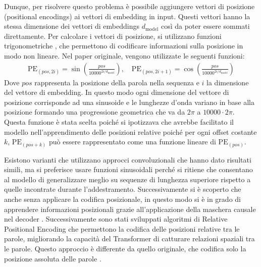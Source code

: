 Dunque, per risolvere questo problema è possibile aggiungere vettori di posizione (positional encodings) ai vettori di embedding in input. Questi vettori hanno la stessa dimensione dei vettori di embeddings  \(d_{\text{model}}\) così da poter essere sommati direttamente. Per calcolare i vettori di posizione, si utilizzano funzioni trigonometriche \cite{dufter2021positioninformationtransformersoverview}, che permettono di codificare informazioni sulla posizione in modo non lineare. Nel paper originale, vengono utilizzate le seguenti funzioni:
\begin{align*}
	\text{PE}_{(pos, 2i)} = \sin\left(\frac{pos}{10000^{2i/d_{\text{model}}}}\right), \quad \text{PE}_{(pos, 2i+1)} = \cos\left(\frac{pos}{10000^{2i/d_{\text{model}}}}\right)
\end{align*}
Dove \(pos\) rappresenta la posizione della parola nella sequenza e \(i\) la dimensione del vettore di embedding. In questo modo ogni dimensione del vettore di posizione corrisponde ad una sinusoide e le lunghezze d'onda variano in base alla posizione formando una progressione geometrica che va da \(2\pi\) a \(10000 \cdot 2\pi\). Questa funzione è stata scelta poiché si ipotizzava che avrebbe facilitato il modello nell'apprendimento delle posizioni relative poiché per ogni offset costante \(k\), \(\text{PE}_{(pos + k)}\) può essere rappresentato come una funzione lineare di \(\text{PE}_{(pos)}\).

Esistono varianti che utilizzano approcci convoluzionali \cite{gehring2017convolutionalsequencesequencelearning} che hanno dato risultati simili, ma si preferisce usare funzioni sinusoidali perché si ritiene che consentano al modello di generalizzare meglio su sequenze di lunghezza superiore rispetto a quelle incontrate durante l'addestramento. Successivamente si è scoperto che anche senza applicare la codifica posizionale, in questo modo si è in grado di apprendere informazioni posizionali grazie all'applicazione della maschera causale nel decoder \cite{haviv2022transformerlanguagemodelspositional}.
Successivamente sono stati sviluppati algoritmi di Relative Positional Encoding \cite{shaw2018selfattentionrelativepositionrepresentations} che permettono la codifica delle posizioni relative tra le parole, migliorando la capacità del Transformer di catturare relazioni spaziali tra le parole. Questo approccio è differente da quello originale, che codifica solo la posizione assoluta delle parole \cite{ke2021rethinkingpositionalencodinglanguage}.